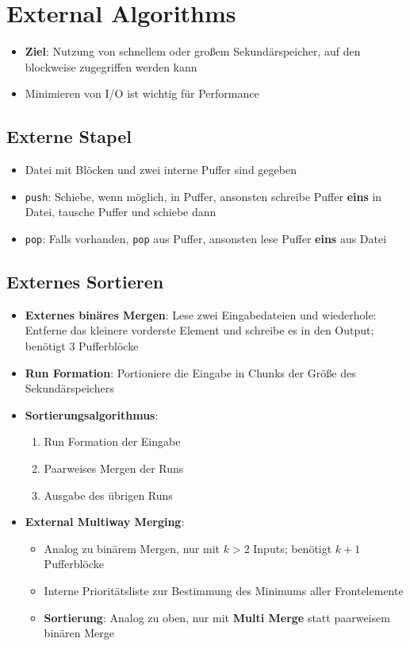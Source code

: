 \section{External Algorithms}%
\label{ea:sec:external_algorithms}

\begin{itemize}
	\item \textbf{Ziel}: Nutzung von schnellem oder großem Sekundärspeicher, auf den blockweise zugegriffen werden kann
	\item Minimieren von I/O ist wichtig für Performance
\end{itemize}

\subsection{Externe Stapel}%
\label{ea:sub:externe_stapel}

\begin{itemize}
	\item Datei mit Blöcken und zwei interne Puffer sind gegeben
	\item \texttt{push}: Schiebe, wenn möglich, in Puffer, ansonsten schreibe Puffer \textbf{eins} in Datei, tausche Puffer und schiebe dann
	\item \texttt{pop}: Falls vorhanden, \texttt{pop} aus Puffer, ansonsten lese Puffer \textbf{eins} aus Datei
\end{itemize}	

\subsection{Externes Sortieren}%
\label{ea:sub:externes_sortieren}

\begin{itemize}
	\item \textbf{Externes binäres Mergen}: Lese zwei Eingabedateien und wiederhole: Entferne das kleinere vorderste Element und schreibe es in den Output; benötigt 3 Pufferblöcke
	\item \textbf{Run Formation}: Portioniere die Eingabe in Chunks der Größe des Sekundärspeichers
	\item \textbf{Sortierungsalgorithmus}:
	\begin{enumerate}
		\item Run Formation der Eingabe
		\item Paarweises Mergen der Runs
		\item Ausgabe des übrigen Runs
	\end{enumerate}
	\item \textbf{External Multiway Merging}:
	\begin{itemize}
		\item Analog zu binärem Mergen, nur mit $k > 2$ Inputs; benötigt $k + 1$ Pufferblöcke
		\item Interne Prioritätsliste zur Bestimmung des Minimums aller Frontelemente
		\item \textbf{Sortierung}: Analog zu oben, nur mit \textbf{Multi Merge} statt paarweisem binären Merge
	\end{itemize}
\end{itemize}	

